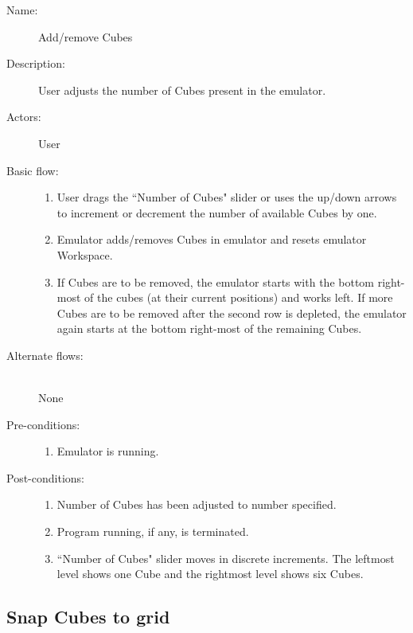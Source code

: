 \documentclass[12pt]{article}
\begin{document}
    \begin{description}
      \item[Name:] Add/remove Cubes
      \item[Description:] User adjusts the number of Cubes present in the emulator.
      \item[Actors:] User
      \item[Basic flow:] \hfill
        \begin{enumerate}
	  \item{User drags the ``Number of Cubes" slider or uses the up/down arrows to increment or decrement the number of available Cubes by one.}
	  \item{Emulator adds/removes Cubes in emulator and resets emulator Workspace.}
	  \item{If Cubes are to be removed, the emulator starts with the bottom right-most of the cubes (at their current positions) and works left. If more Cubes are to be removed after the second row is depleted, the emulator again starts at the bottom right-most of the remaining Cubes.}
        \end{enumerate}
      \item[Alternate flows:] \hfill \\
	None
      \item[Pre-conditions:] \hfill
        \begin{enumerate}
	  \item{Emulator is running.}
        \end{enumerate}
      \item[Post-conditions:] \hfill
        \begin{enumerate}
	  \item{Number of Cubes has been adjusted to number specified.}
	  \item{Program running, if any, is terminated.}
	  \item{``Number of Cubes" slider moves in discrete increments. The leftmost level shows one Cube and the rightmost level shows six Cubes.}
        \end{enumerate}
    \end{description}

  \subsection{Snap Cubes to grid}
\end{document}
